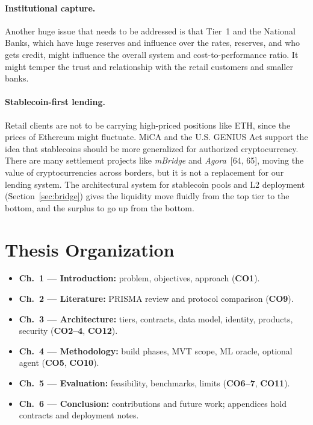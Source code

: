 \documentclass[12pt, a4paper]{report}
\begin{document}
\paragraph{Institutional capture.} Another huge issue that needs to be addressed is that Tier~1 and the National Banks, which have huge reserves and influence over the rates, reserves, and who gets credit, might influence the overall system and cost-to-performance ratio. It might temper the trust and relationship with the retail customers and smaller banks.

\paragraph{Stablecoin-first lending.}
\label{sec:stablecoin-first}
Retail clients are not to be carrying high-priced positions like ETH, since the prices of Ethereum might fluctuate. MiCA and the U.S. GENIUS Act support the idea that stablecoins should be more generalized for authorized cryptocurrency. There are many settlement projects like \textit{mBridge} and \textit{Agora}~[64, 65], moving the value of cryptocurrencies across borders, but it is not a replacement for our lending system. The architectural system for stablecoin pools and L2 deployment (Section~\ref{sec:bridge}) gives the liquidity move fluidly from the top tier to the bottom, and the surplus to go up from the bottom.

\section{Thesis Organization}
\label{sec:thesis-organization}

\begin{itemize}[noitemsep]
\item \textbf{Ch.~1 --- Introduction:} problem, objectives, approach (\textbf{CO1}).
\item \textbf{Ch.~2 --- Literature:} PRISMA review and protocol comparison (\textbf{CO9}).
\item \textbf{Ch.~3 --- Architecture:} tiers, contracts, data model, identity, products, security (\textbf{CO2--4}, \textbf{CO12}).
\item \textbf{Ch.~4 --- Methodology:} build phases, MVT scope, ML oracle, optional agent (\textbf{CO5}, \textbf{CO10}).
\item \textbf{Ch.~5 --- Evaluation:} feasibility, benchmarks, limits (\textbf{CO6--7}, \textbf{CO11}).
\item \textbf{Ch.~6 --- Conclusion:} contributions and future work; appendices hold contracts and deployment notes.
\end{itemize}
\end{document}

